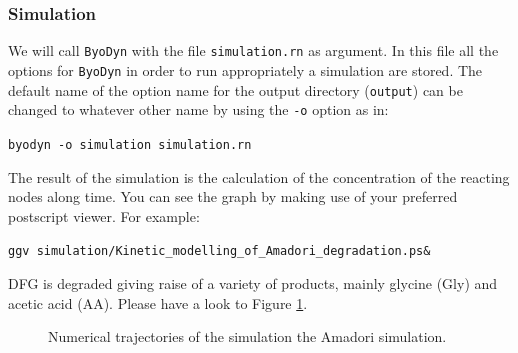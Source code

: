 \documentclass[a4paper, 11pt]{article}
\begin{document}
  \subsubsection{Simulation}
  We will call \texttt{ByoDyn} with the file \texttt{simulation.rn} as argument. 
  In this file all the options for \texttt{ByoDyn} in order to run appropriately a simulation are stored.
  The default name of the option name for the output directory (\texttt{output}) can be changed to whatever other name by using the \texttt{-o} option as in:
  \begin{center}
    \texttt{byodyn -o simulation simulation.rn}
  \end{center}
  The result of the simulation is the calculation of the concentration of the reacting nodes along time.
  You can see the graph by making use of your preferred postscript viewer. For example:
  \begin{center}
    \texttt{ggv simulation/Kinetic\_modelling\_of\_Amadori\_degradation.ps\&}
  \end{center}
  DFG is degraded giving raise of a variety of products, mainly glycine (Gly) and acetic acid (AA).
  Please have a look to Figure \ref{amadoriSimulation.eps}.
  \begin{figure}
    \begin{center}
      \caption{Numerical trajectories of the simulation the Amadori simulation.}\label{amadoriSimulation.eps}
    \end{center}
  \end{figure} 
\end{document}
